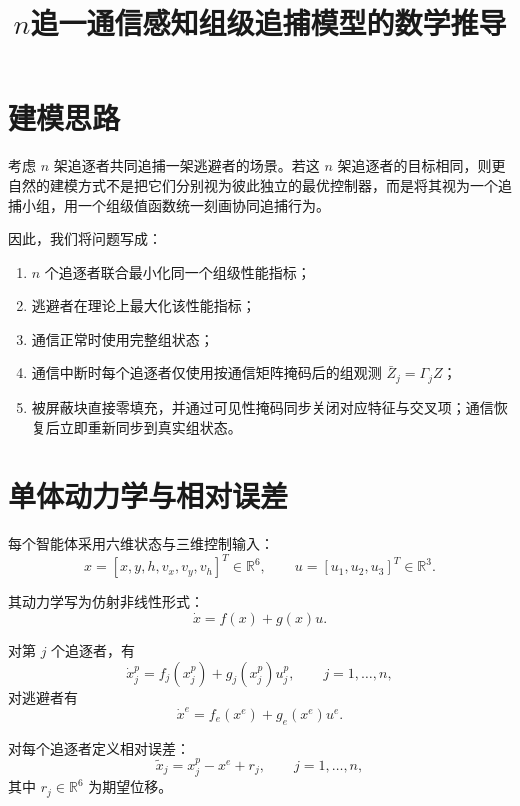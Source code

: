 ﻿\documentclass[12pt,a4paper]{ctexart}
\title{$n$追一通信感知组级追捕模型的数学推导}
\author{}
\date{}
\begin{document}
\maketitle

\section{建模思路}

考虑 $n$ 架追逐者共同追捕一架逃避者的场景。若这 $n$ 架追逐者的目标相同，则更自然的建模方式不是把它们分别视为彼此独立的最优控制器，而是将其视为一个追捕小组，用一个组级值函数统一刻画协同追捕行为。

因此，我们将问题写成：
\begin{enumerate}[label=\arabic*)]
    \item $n$ 个追逐者联合最小化同一个组级性能指标；
    \item 逃避者在理论上最大化该性能指标；
    \item 通信正常时使用完整组状态；
    \item 通信中断时每个追逐者仅使用按通信矩阵掩码后的组观测 $\bar Z_j=\Gamma_j Z$；
    \item 被屏蔽块直接零填充，并通过可见性掩码同步关闭对应特征与交叉项；通信恢复后立即重新同步到真实组状态。
\end{enumerate}

\section{单体动力学与相对误差}

每个智能体采用六维状态与三维控制输入：
\begin{equation}
    x=[x,y,h,v_x,v_y,v_h]^T\in\mathbb{R}^6,
    \qquad
    u=[u_1,u_2,u_3]^T\in\mathbb{R}^3.
\end{equation}

其动力学写为仿射非线性形式：
\begin{equation}
    \dot x = f(x)+g(x)u.
\end{equation}

对第 $j$ 个追逐者，有
\begin{equation}
    \dot x_j^p = f_j(x_j^p)+g_j(x_j^p)u_j^p,
    \qquad j=1,\dots,n,
\end{equation}
对逃避者有
\begin{equation}
    \dot x^e = f_e(x^e)+g_e(x^e)u^e.
\end{equation}

对每个追逐者定义相对误差：
\begin{equation}
    \tilde x_j = x_j^p - x^e + r_j,
    \qquad j=1,\dots,n,
\end{equation}
其中 $r_j\in\mathbb{R}^6$ 为期望位移。
\end{document}
